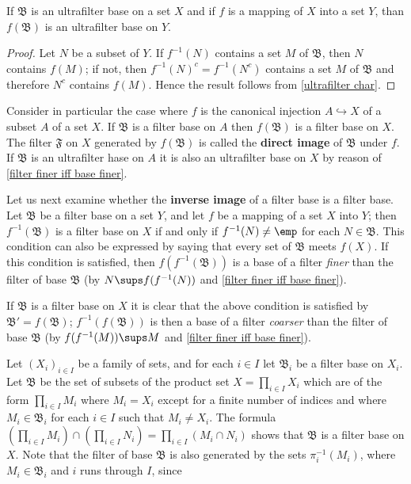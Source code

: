 \begin{proposition}
If $\mathfrak{B}$ is an ultrafilter base on a set $X$ and if $f$ is a mapping of $X$ into a set $Y$, than $f(\mathfrak{B})$ is an ultrafilter base on $Y$.
\end{proposition}
\begin{proof}
Let $N$ be a subset of $Y$. If $f^{-1}(N)$ contains a set $M$ of $\mathfrak{B}$, then $N$ contains $f(M)$; if not, then $f^{-1}(N)^c=f^{-1}(N^c)$ contains a set $M$ of $\mathfrak{B}$ and therefore $N^c$ contains $f(M)$. Hence the result follows from \cref{ultrafilter char}.
\end{proof}
Consider in particular the case where $f$ is the canonical injection $A\hookrightarrow X$ of a subset $A$ of a set $X$. If $\mathfrak{B}$ is a filter base on $A$ then $f(\mathfrak{B})$ is a filter base on $X$. The filter $\mathfrak{F}$ on $X$ generated by $f(\mathfrak{B})$ is called the \textbf{direct image} of $\mathfrak{B}$ under $f$. If $\mathfrak{B}$ is an ultrafilter hase on $A$ it is also an ultrafilter base on $X$ by reason of \cref{filter finer iff base finer}.\par
Let us next examine whether the \textbf{inverse image} of a filter base is a filter base. Let $\mathfrak{B}$ be a filter base on a set $Y$, and let $f$ be a mapping of a set $X$ into $Y$; then $f^{-1}(\mathfrak{B})$ is a filter base on $X$ if and only if $f^{-1}(N)\neq\emp$ for each $N\in\mathfrak{B}$. This condition can also be expressed by saying that every set of $\mathfrak{B}$ meets $f(X)$. If this condition is satisfied, then $f(f^{-1}(\mathfrak{B}))$ is a base of a filter \textit{finer} than the filter of base $\mathfrak{B}$ (by $N\sups f(f^{-1}(N))$ and \cref{filter finer iff base finer}).\par
If $\mathfrak{B}$ is a filter base on $X$ it is clear that the above condition is satisfied by $\mathfrak{B}'=f(\mathfrak{B})$; $f^{-1}(f(\mathfrak{B}))$ is then a base of a filter \textit{coarser} than the filter of base $\mathfrak{B}$ (by $f(f^{-1}(M))\sups M$ and \cref{filter finer iff base finer}).\par
Let $(X_i)_{i\in I}$ be a family of sets, and for each $i\in I$ let $\mathfrak{B}_i$ be a filter base on $X_i$. Let $\mathfrak{B}$ be the set of subsets of the product set $X=\prod_{i\in I}X_i$ which are of the form $\prod_{i\in I}M_i$ where $M_i=X_i$ except for a finite number of indices and where $M_i\in\mathfrak{B}_i$ for each $i\in I$ such that $M_i\neq X_i$. The formula $(\prod_{i\in I}M_i)\cap(\prod_{i\in I}N_i)=\prod_{i\in I}(M_i\cap N_i)$ shows that $\mathfrak{B}$ is a filter base on $X$. Note that the filter of base $\mathfrak{B}$ is also generated by the sets $\pi_i^{-1}(M_i)$, where $M_i\in\mathfrak{B}_i$ and $i$ runs through $I$, since
